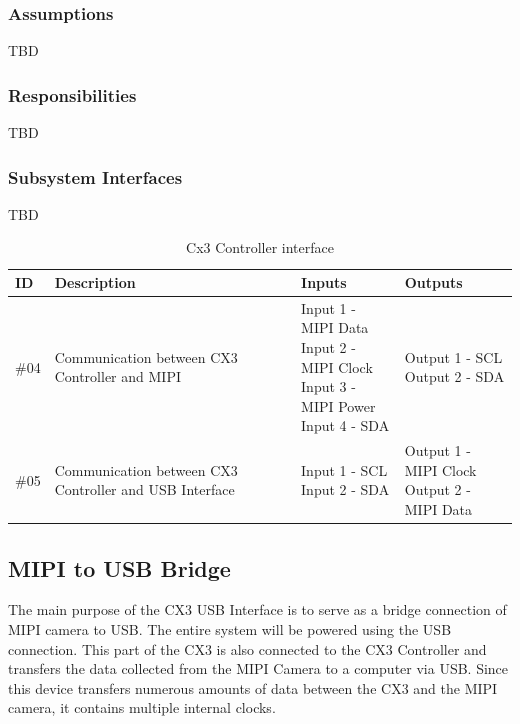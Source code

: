 \subsubsection{Assumptions}
TBD

\subsubsection{Responsibilities}
TBD

\subsubsection{Subsystem Interfaces}
TBD

\begin {table}[H]
\caption {Cx3 Controller interface}
\begin{center}
    \begin{tabular}{ | p{1cm} | p{6cm} | p{3cm} | p{3cm} |}
    \hline
    ID & Description & Inputs & Outputs \\ \hline
    \#04 & Communication between CX3 Controller and MIPI & \pbox{3cm}{Input 1 - MIPI Data \\ Input 2 - MIPI Clock \\ Input 3 - MIPI Power \\ Input 4 - SDA} & \pbox{3cm}{Output 1 - SCL \\ Output 2 - SDA}  \\ \hline
    \#05 & Communication between CX3 Controller and USB Interface & \pbox{3cm}{Input 1 - SCL \\ Input 2 - SDA} & \pbox{3cm}{Output 1 - MIPI Clock \\ Output 2 - MIPI Data}  \\ \hline
    \end{tabular}
\end{center}
\end{table}

\subsection{MIPI to USB Bridge}
The main purpose of the CX3 USB Interface is to serve as a bridge connection of MIPI camera to USB. The entire system will be powered using the USB connection. This part of the CX3 is also connected to the CX3 Controller and transfers the data collected from the MIPI Camera to a computer via USB. Since this device transfers numerous amounts of data between the CX3 and the MIPI camera, it contains multiple internal clocks.

